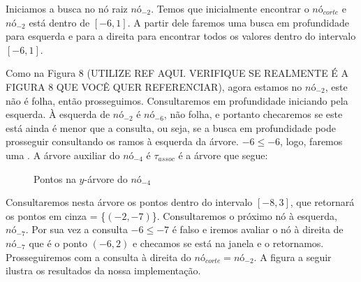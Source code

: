 Iniciamos a busca no nó raiz $nó_{-2}$. Temos que inicialmente encontrar o $nó_{corte}$ e $nó_{-2}$ está dentro de $[-6, 1]$.
A partir dele faremos uma busca em profundidade para esquerda e para a direita para encontrar todos 
os valores dentro do intervalo $[-6,1]$. 

Como na Figura 8 (UTILIZE REF{} AQUI. VERIFIQUE SE REALMENTE É A FIGURA 8 QUE VOCÊ QUER REFERENCIAR), agora estamos no $nó_{-2}$, este não é folha, então prosseguimos.
Consultaremos em profundidade iniciando pela esquerda. À esquerda de $nó_{-2}$ é $nó_{-6}$, não folha, e portanto checaremos se este está ainda é menor que a consulta, ou seja, se a busca em profundidade pode prosseguir consultando os ramos à esquerda da árvore. $-6 \leq -6$, logo, faremos uma . A árvore auxiliar do $nó_{-4}$ é $\tau_{assoc}$ é a árvore que segue:


\begin{figure}[h]
    \centering
{}
\caption{Pontos na $y$-árvore do $nó_{-4}$}
\end{figure}

Consultaremos nesta árvore os pontos dentro do intervalo $[-8, 3]$, que retornará os pontos em cinza = \{$(-2,-7)$\}.
Consultaremos o próximo nó à esquerda, $nó_{-7}$. Por sua vez a consulta $-6 \leq -7$ é falso e iremos avaliar o nó à direita de $nó_{-7}$ que é o ponto $(-6, 2)$ e checamos se está na janela e o retornamos.
Prosseguiremos com a consulta à direita do $nó_{corte}= nó_{-2}$. A figura a seguir ilustra os resultados da nossa implementação.


